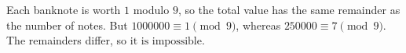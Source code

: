 Each banknote is worth $1$ modulo $9$, so the total value has the same remainder as the number of notes. But $1000000\equiv 1\pmod 9$, whereas $250000\equiv 7\pmod 9$. The remainders differ, so $\boxed{\text{it is impossible}}$.
